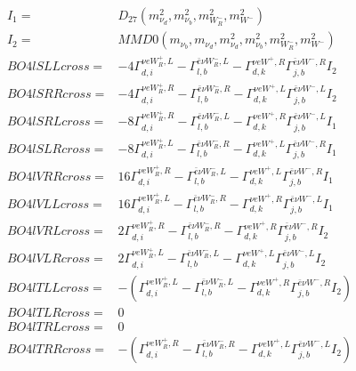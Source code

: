 \documentclass[A4,landscape]{article}
\begin{document}
\begin{align} 
I_1 = & D_{27}(m^2_{\nu_{{d}}}, m^2_{\nu_{{b}}}, m^2_{W_R^-}, m^2_{W^-}) \\ 
I_2 = & MMD0(m_{\nu_{{b}}}, m_{\nu_{{d}}}, m^2_{\nu_{{d}}}, m^2_{\nu_{{b}}}, m^2_{W_R^-}, m^2_{W^-}) \\ 
  BO4lSLLcross= & -4  \Gamma^{\nu e W_R^+,L}_{d, i} - \Gamma^{\bar{e}\nu W_R^- ,L} _{l, b} - \Gamma^{\nu e W^+,R} _{d, k} \Gamma^{\bar{e}\nu W^- ,R}_{j, b} I_2 \\ 
  BO4lSRRcross= & -4  \Gamma^{\nu e W_R^+,R}_{d, i} - \Gamma^{\bar{e}\nu W_R^- ,R} _{l, b} - \Gamma^{\nu e W^+,L} _{d, k} \Gamma^{\bar{e}\nu W^- ,L}_{j, b} I_2 \\ 
  BO4lSRLcross= & -8  \Gamma^{\nu e W_R^+,R}_{d, i} - \Gamma^{\bar{e}\nu W_R^- ,L} _{l, b} - \Gamma^{\nu e W^+,R} _{d, k} \Gamma^{\bar{e}\nu W^- ,L}_{j, b} I_1 \\ 
  BO4lSLRcross= & -8  \Gamma^{\nu e W_R^+,L}_{d, i} - \Gamma^{\bar{e}\nu W_R^- ,R} _{l, b} - \Gamma^{\nu e W^+,L} _{d, k} \Gamma^{\bar{e}\nu W^- ,R}_{j, b} I_1 \\ 
  BO4lVRRcross= & 16  \Gamma^{\nu e W_R^+,R}_{d, i} - \Gamma^{\bar{e}\nu W_R^- ,L} _{l, b} - \Gamma^{\nu e W^+,L} _{d, k} \Gamma^{\bar{e}\nu W^- ,R}_{j, b} I_1 \\ 
  BO4lVLLcross= & 16  \Gamma^{\nu e W_R^+,L}_{d, i} - \Gamma^{\bar{e}\nu W_R^- ,R} _{l, b} - \Gamma^{\nu e W^+,R} _{d, k} \Gamma^{\bar{e}\nu W^- ,L}_{j, b} I_1 \\ 
  BO4lVRLcross= & 2  \Gamma^{\nu e W_R^+,R}_{d, i} - \Gamma^{\bar{e}\nu W_R^- ,R} _{l, b} - \Gamma^{\nu e W^+,R} _{d, k} \Gamma^{\bar{e}\nu W^- ,R}_{j, b} I_2 \\ 
  BO4lVLRcross= & 2  \Gamma^{\nu e W_R^+,L}_{d, i} - \Gamma^{\bar{e}\nu W_R^- ,L} _{l, b} - \Gamma^{\nu e W^+,L} _{d, k} \Gamma^{\bar{e}\nu W^- ,L}_{j, b} I_2 \\ 
  BO4lTLLcross= & -( \Gamma^{\nu e W_R^+,L}_{d, i} - \Gamma^{\bar{e}\nu W_R^- ,L} _{l, b} - \Gamma^{\nu e W^+,R} _{d, k} \Gamma^{\bar{e}\nu W^- ,R}_{j, b} I_2) \\ 
  BO4lTLRcross= & 0 \\ 
  BO4lTRLcross= & 0 \\ 
  BO4lTRRcross= & -( \Gamma^{\nu e W_R^+,R}_{d, i} - \Gamma^{\bar{e}\nu W_R^- ,R} _{l, b} - \Gamma^{\nu e W^+,L} _{d, k} \Gamma^{\bar{e}\nu W^- ,L}_{j, b} I_2) \\ 
\end{align} 
\end{document}
